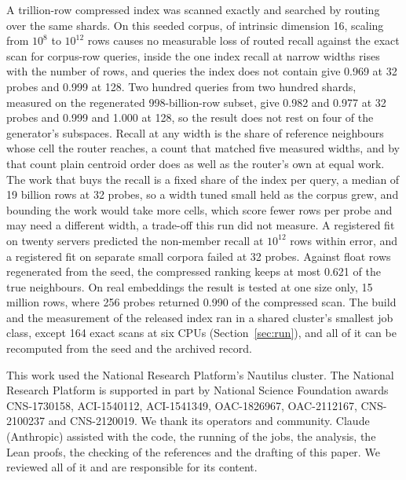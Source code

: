 \documentclass[sigconf, nonacm]{acmart}
\begin{document}
A trillion-row compressed index was scanned exactly and searched by routing over the same shards.
On this seeded corpus, of intrinsic dimension 16, scaling from $10^{8}$ to $10^{12}$ rows causes no measurable loss of routed
recall against the exact scan for corpus-row queries, inside the one index recall at narrow widths rises with the number of
rows, and queries the index does not contain give 0.969 at 32 probes and 0.999 at 128.
Two hundred queries from two hundred shards, measured on the regenerated 998-billion-row subset, give
0.982 and 0.977 at 32 probes and 0.999 and 1.000 at 128, so the result does not rest on four
of the generator's subspaces. Recall at any width is the share of reference neighbours whose cell the
router reaches, a count that matched five measured widths, and by that count plain centroid order
does as well as the router's own at equal work. The work that buys the recall is a fixed share of
the index per query, a median of 19 billion rows at 32 probes, so a width tuned small held as the
corpus grew, and bounding the work would take more cells, which score fewer rows per probe and
may need a different width, a trade-off this run did not measure. A registered fit on twenty servers
predicted the non-member recall at $10^{12}$ rows within error, and a registered fit on separate
small corpora failed at 32 probes. Against float rows
regenerated from the seed, the compressed ranking keeps at most 0.621 of the true neighbours. On
real embeddings the result is tested at one size only, 15 million rows, where 256 probes returned
0.990 of the compressed scan. The
build and the measurement of the released index ran in a shared cluster's smallest job class,
except 164 exact scans at six CPUs (Section~\ref{sec:run}), and
all of it can be recomputed from the seed and the archived record.

\begin{acks}
This work used the National Research Platform's Nautilus cluster. The National Research Platform
is supported in part by National Science Foundation awards CNS-1730158, ACI-1540112, ACI-1541349,
OAC-1826967, OAC-2112167, CNS-2100237 and CNS-2120019. We thank its operators and community.
Claude (Anthropic) assisted with the code, the running of the jobs, the analysis, the Lean proofs,
the checking of the references and the drafting of this paper. We reviewed all of it and are
responsible for its content.
\end{acks}



\end{document}
